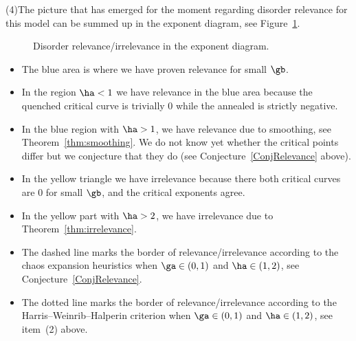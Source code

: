 \medskip
\noindent (4)\enskip The picture that has emerged for the moment regarding disorder relevance for this model can be summed up in the exponent diagram, see Figure~\ref{fig.sum}.
\begin{figure}
\begin{center}
\end{center}
\caption{\label{fig.sum}
Disorder relevance/irrelevance in the exponent diagram. }
\end{figure}
\begin{itemize}
\item The blue area is where we have proven relevance for small $\gb$.
\item In the region $\ha < 1$ we have relevance in the blue area because the quenched critical curve is trivially 0 while the annealed is strictly negative.
\item In the blue region with $\ha > 1$, we have relevance due to smoothing, see Theorem~\ref{thm:smoothing}. We do not know yet whether the critical points differ but we conjecture that they do (see Conjecture~\ref{ConjRelevance} above).
\item In the yellow triangle we have irrelevance because there both critical curves are 0 for small $\gb$, and the critical exponents agree.
\item In the yellow part with $\ha > 2$, we have irrelevance due to Theorem~\ref{thm:irrelevance}.
\item The dashed line marks the border of relevance/irrelevance according to the chaos expansion heuristics when $\ga\in(0,1)$ and $\ha\in(1,2)$, see Conjecture~\ref{ConjRelevance}.
\item The dotted line marks the border of relevance/irrelevance according to the Harris--Weinrib--Halperin criterion when $\ga\in(0,1)$ and $\ha\in(1,2)$, see item~(2) above.
\end{itemize}
